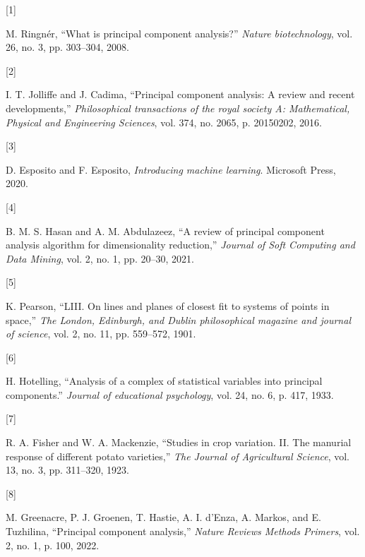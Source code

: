 \documentclass[
  letterpaper,
  DIV=11,
  numbers=noendperiod]{scrreprt}
\newlength{\cslhangindent}
\newlength{\csllabelwidth}
\newlength{\cslentryspacingunit} %
\newenvironment{CSLReferences}[2] %
 {%
  \setlength{\parindent}{0pt}
  \ifodd #1
  \let\oldpar\par
  \def\par{\hangindent=\cslhangindent\oldpar}
  \fi
  \setlength{\parskip}{#2\cslentryspacingunit}
 }%
 {}
\newcommand{\CSLLeftMargin}[1]{\parbox[t]{\csllabelwidth}{#1}}
\newcommand{\CSLRightInline}[1]{\parbox[t]{\linewidth - \csllabelwidth}{#1}\break}
\begin{document}
\hypertarget{refs}{}
\begin{CSLReferences}{0}{0}
\leavevmode{}%
\CSLLeftMargin{{[}1{]} }%
\CSLRightInline{M. Ringnér, {``What is principal component analysis?''}
\emph{Nature biotechnology}, vol. 26, no. 3, pp. 303--304, 2008.}

\leavevmode{}%
\CSLLeftMargin{{[}2{]} }%
\CSLRightInline{I. T. Jolliffe and J. Cadima, {``Principal component
analysis: A review and recent developments,''} \emph{Philosophical
transactions of the royal society A: Mathematical, Physical and
Engineering Sciences}, vol. 374, no. 2065, p. 20150202, 2016.}

\leavevmode{}%
\CSLLeftMargin{{[}3{]} }%
\CSLRightInline{D. Esposito and F. Esposito, \emph{Introducing machine
learning}. Microsoft Press, 2020.}

\leavevmode{}%
\CSLLeftMargin{{[}4{]} }%
\CSLRightInline{B. M. S. Hasan and A. M. Abdulazeez, {``A review of
principal component analysis algorithm for dimensionality reduction,''}
\emph{Journal of Soft Computing and Data Mining}, vol. 2, no. 1, pp.
20--30, 2021.}

\leavevmode{}%
\CSLLeftMargin{{[}5{]} }%
\CSLRightInline{K. Pearson, {``LIII. On lines and planes of closest fit
to systems of points in space,''} \emph{The London, Edinburgh, and
Dublin philosophical magazine and journal of science}, vol. 2, no. 11,
pp. 559--572, 1901.}

\leavevmode{}%
\CSLLeftMargin{{[}6{]} }%
\CSLRightInline{H. Hotelling, {``Analysis of a complex of statistical
variables into principal components.''} \emph{Journal of educational
psychology}, vol. 24, no. 6, p. 417, 1933.}

\leavevmode{}%
\CSLLeftMargin{{[}7{]} }%
\CSLRightInline{R. A. Fisher and W. A. Mackenzie, {``Studies in crop
variation. II. The manurial response of different potato varieties,''}
\emph{The Journal of Agricultural Science}, vol. 13, no. 3, pp.
311--320, 1923.}

\leavevmode{}%
\CSLLeftMargin{{[}8{]} }%
\CSLRightInline{M. Greenacre, P. J. Groenen, T. Hastie, A. I. d'Enza, A.
Markos, and E. Tuzhilina, {``Principal component analysis,''}
\emph{Nature Reviews Methods Primers}, vol. 2, no. 1, p. 100, 2022.}


\end{CSLReferences}
\end{document}
